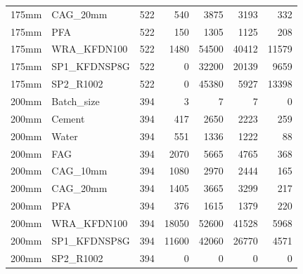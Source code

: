 \documentclass[
]{article}
\begin{document}
\begin{longtable}[]{@{}llrrrrr@{}}
175mm & CAG\_20mm & 522 & 540 & 3875 & 3193 & 332 \\
175mm & PFA & 522 & 150 & 1305 & 1125 & 208 \\
175mm & WRA\_KFDN100 & 522 & 1480 & 54500 & 40412 & 11579 \\
175mm & SP1\_KFDNSP8G & 522 & 0 & 32200 & 20139 & 9659 \\
175mm & SP2\_R1002 & 522 & 0 & 45380 & 5927 & 13398 \\
200mm & Batch\_size & 394 & 3 & 7 & 7 & 0 \\
200mm & Cement & 394 & 417 & 2650 & 2223 & 259 \\
200mm & Water & 394 & 551 & 1336 & 1222 & 88 \\
200mm & FAG & 394 & 2070 & 5665 & 4765 & 368 \\
200mm & CAG\_10mm & 394 & 1080 & 2970 & 2444 & 165 \\
200mm & CAG\_20mm & 394 & 1405 & 3665 & 3299 & 217 \\
200mm & PFA & 394 & 376 & 1615 & 1379 & 220 \\
200mm & WRA\_KFDN100 & 394 & 18050 & 52600 & 41528 & 5968 \\
200mm & SP1\_KFDNSP8G & 394 & 11600 & 42060 & 26770 & 4571 \\
200mm & SP2\_R1002 & 394 & 0 & 0 & 0 & 0 \\
\bottomrule()
\end{longtable}
\end{document}
